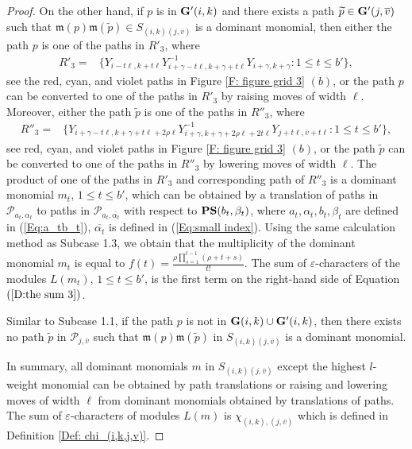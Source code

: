 \documentclass[12pt, reqno]{amsart}
\numberwithin{equation}{section}
\begin{document}
{\begin{proof}
On the other hand, if $p$ is in ${\bf G'}(i,k)$ and there exists a path $\widetilde{p}\in {\bf G'}(j,\overline{v})$ such that $\mathfrak{m}(p)\mathfrak{m}(\widetilde{p}) \in S_{(i, k)(j, \overline{v})}$ is a dominant monomial, then either the path $p$ is one of the paths in $R'_3$, where
\begin{align*}
R'_3=&\{Y_{i-t \ell,k+t \ell}Y_{i+\gamma-t \ell,k+\gamma+ t\ell}^{-1}Y_{i+\gamma,k+\gamma}: 1\leq t\leq b'\},
\end{align*}
see the red, cyan, and violet paths in Figure \ref{F: figure grid 3} $(b)$, or the path $p$ can be converted to one of the paths in $R'_3$ by raising moves of width $\ell$. Moreover, either the path $\widetilde{p}$ is one of the paths in $R''_3$, where
\begin{align*}
R''_3=&\{Y_{i+\gamma-t\ell,k+\gamma+t \ell+2\rho \ell}Y_{i+\gamma,k+\gamma+2\rho \ell+2t \ell}^{-1}Y_{j+t \ell,\overline{v}+t \ell}: 1\leq t\leq b'\},
\end{align*}
see red, cyan, and violet paths in Figure \ref{F: figure grid 3} $(b)$, or the path $\widetilde{p}$ can be converted to one of the paths in $R''_3$ by lowering moves of width $\ell$. The product of one of the paths in $R'_3$ and corresponding path of $R''_3$ is a dominant monomial $m_t$, $1\leq t\leq b'$, which can be obtained by a translation of paths in $\mathscr{P}_{a_t, \alpha_t}$ to paths in $\mathscr{P}_{a_t,\overline{\alpha_t}}$ with respect to ${\bf PS}(b_t,\beta_t)$, where $a_t, \alpha_t, b_t,\beta_t$ are defined in (\ref{Eq:a_tb_t}), $\overline{\alpha_t}$ is defined in (\ref{Eq:small index}). Using the same calculation method as Subcase 1.3, we obtain that the multiplicity of the dominant monomial $m_t$ is equal to $f(t) = \frac{ \rho \prod_{s=1}^{t-1}(\rho+t+s)}{t!}$. The sum of $\varepsilon$-characters of the modules $L(m_t)$, $1\leq t\leq b'$, is the first term on the right-hand side of Equation $(\ref{D:the sum 3})$.

Similar to Subcase 1.1, if the path $p$ is not in ${\bf G}(i,k) \cup {\bf G'}(i,k)$, then there exists no path $\widetilde{p}$ in $\mathscr{P}_{j, \overline{v}}$ such that $\mathfrak{m}(p)\mathfrak{m}(\widetilde{p})$ in $S_{(i, k)(j, \overline{v})}$ is a dominant monomial.

In summary, all dominant monomials $m$ in $S_{(i, k)(j, \overline{v})}$ except the highest $l$-weight monomial can be obtained by path translations or raising and lowering moves of width $\ell$ from dominant monomials obtained by translations of paths. The sum of $\varepsilon$-characters of modules $L(m)$ is $\chi_{(i,k),(j,\overline{v})}$ which is defined in Definition \ref{Def: chi_(i,k,j,v)}.
\end{proof}


}
\end{document}
